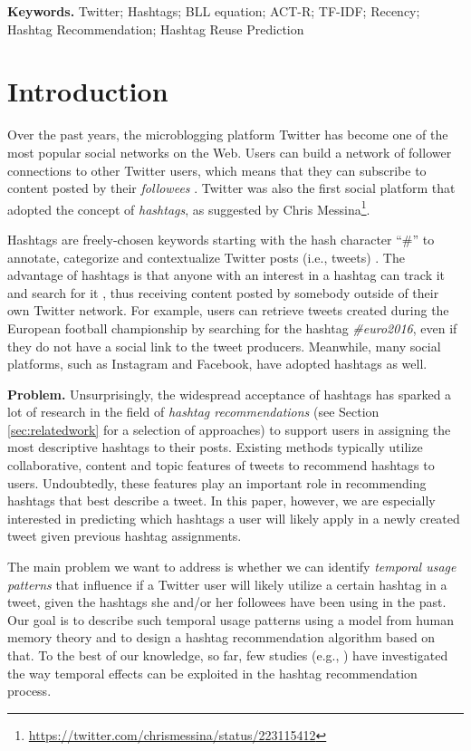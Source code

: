 \documentclass{sig-alternate-05-2015}
\newcommand{\para}[1]{\vspace{2mm}\noindent\textbf{#1}}
\begin{document}
\para{Keywords.} Twitter; Hashtags; BLL equation; ACT-R; TF-IDF; Recency; Hashtag Recommendation; Hashtag Reuse Prediction






\section{Introduction} \label{sec:intro}
Over the past years, the microblogging platform Twitter has become one of the most popular social networks on the Web. Users can build a network of follower connections to other Twitter users, which means that they can subscribe to content posted by their \textit{followees} \cite{Myers2014,kwak2010}. Twitter was also the first social platform that adopted the concept of \textit{hashtags}, as suggested by Chris Messina\footnote{\url{https://twitter.com/chrismessina/status/223115412}}.

Hashtags are freely-chosen keywords starting with the hash character ``\#'' to annotate, categorize and contextualize Twitter posts (i.e., tweets) \cite{romero2011,Huang2010}. The advantage of hashtags is that anyone with an interest in a hashtag can track it and search for it \cite{small2011hashtag}, thus receiving content posted by somebody outside of their own Twitter network. For example, users can retrieve tweets created during the European football championship by searching for the hashtag \textit{\#euro2016}, even if they do not have a social link to the tweet producers. Meanwhile, many social platforms, such as Instagram and Facebook, have adopted hashtags as well.

\para{Problem.} Unsurprisingly, the widespread acceptance of hashtags has sparked a lot of research in the field of \textit{hashtag recommendations} (see Section \ref{sec:relatedwork} for a selection of approaches) to support users in assigning the most descriptive hashtags to their posts. Existing methods typically utilize collaborative, content and topic features of tweets to recommend hashtags to users. Undoubtedly, these features play an important role in recommending hashtags that best describe a tweet. In this paper, however, we are especially interested in predicting which hashtags a user will likely apply in a newly created tweet given previous hashtag assignments.

The main problem we want to address is whether we can identify \textit{temporal usage patterns} that influence if a Twitter user will likely utilize a certain hashtag in a tweet, given the hashtags she and/or her followees have been using in the past. Our goal is to describe such temporal usage patterns using a model from human memory theory and to design a hashtag recommendation algorithm based on that. To the best of our knowledge, so far, few studies (e.g., \cite{harvey2015long}) have investigated the way temporal effects can be exploited in the hashtag recommendation process.
\end{document}
